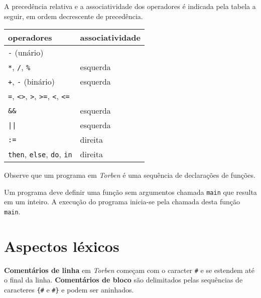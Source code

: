 \documentclass[a4paper,10pt,brazil]{article}
\newcommand{\lang}{\textsl{Torben}}
\begin{document}
A precedência relativa e a associatividade dos operadores é indicada
pela tabela a seguir, em ordem decrescente de precedência.
\begin{center}
  \begin{tabular}{|l|l|}\hline
    \textbf{operadores}                                                       & \textbf{associatividade} \\\hline
    \texttt{-} (unário)                                                       &                          \\\hline
    \texttt{*}, \texttt{/}, \texttt{\%}                                       & esquerda                 \\\hline
    \texttt{+}, \texttt{-} (binário)                                          & esquerda                 \\\hline
    \texttt{=}, \texttt{<>}, \texttt{>}, \texttt{>=}, \texttt{<}, \texttt{<=} &                          \\\hline
    \texttt{\&\&}                                                             & esquerda                 \\\hline
    \texttt{||}                                                               & esquerda                 \\\hline
    \texttt{:=}                                                               & direita                  \\\hline
    \texttt{then}, \texttt{else}, \texttt{do}, \texttt{in}                    & direita                  \\\hline
  \end{tabular}
\end{center}


Observe que um programa em \lang{} é uma sequência de declarações de
funções.

Um programa deve definir uma função sem argumentos chamada \texttt{main}
que resulta em um inteiro. A execução do programa inicia-se pela chamada
desta função \texttt{main}.


\section{Aspectos léxicos}

\textbf{Comentários de linha} em \lang{} começam com o caracter
\texttt{\#} e se estendem até o final da linha. \textbf{Comentários de
  bloco} são delimitados pelas sequências de caracteres \texttt{\{\#}
e \texttt{\#\}} e podem ser aninhados.
\end{document}
